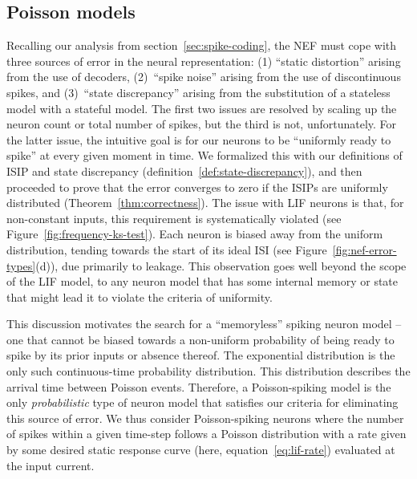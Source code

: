 \subsection{Poisson models}
\label{sec:poisson-spiking}

Recalling our analysis from section~\ref{sec:spike-coding}, the NEF must cope with three sources of error in the neural representation: (1) ``static distortion'' arising from the use of decoders, (2)~``spike noise'' arising from the use of discontinuous spikes, and (3)~``state discrepancy'' arising from the substitution of a stateless model with a stateful model.
The first two issues are resolved by scaling up the neuron count or total number of spikes, but the third is not, unfortunately.
For the latter issue, the intuitive goal is for our neurons to be ``uniformly ready to spike'' at every given moment in time.
We formalized this with our definitions of ISIP and state discrepancy (definition~\ref{def:state-discrepancy}), and then proceeded to prove that the error converges to zero if the ISIPs are uniformly distributed (Theorem~\ref{thm:correctness}).
The issue with LIF neurons is that, for non-constant inputs, this requirement is systematically violated (see Figure~\ref{fig:frequency-ks-test}).
Each neuron is biased away from the uniform distribution, tending towards the start of its ideal ISI (see Figure~\ref{fig:nef-error-types}(d)), due primarily to leakage.
This observation goes well beyond the scope of the LIF model, to any neuron model that has some internal memory or state that might lead it to violate the criteria of uniformity.

This discussion motivates the search for a ``memoryless'' spiking neuron model -- one that cannot be biased towards a non-uniform probability of being ready to spike by its prior inputs or absence thereof.
The exponential distribution is the only such continuous-time probability distribution.
This distribution describes the arrival time between Poisson events.
Therefore, a Poisson-spiking model is the only \emph{probabilistic} type of neuron model that satisfies our criteria for eliminating this source of error.
We thus consider Poisson-spiking neurons where the number of spikes within a given time-step follows a Poisson distribution with a rate given by some desired static response curve (here, equation~\ref{eq:lif-rate}) evaluated at the input current.

